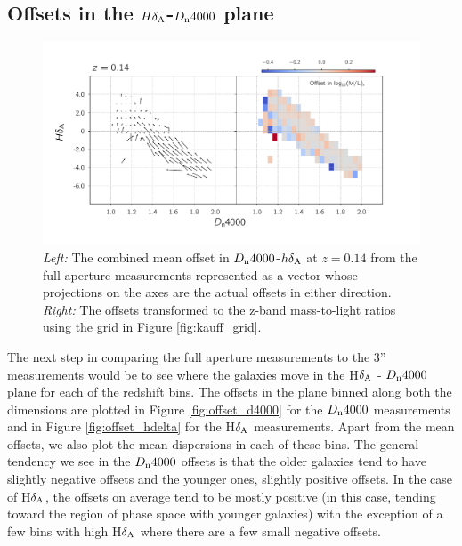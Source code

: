 \subsection{Offsets in the $H\delta_{\rm A}$-$D_{\rm n}4000$ plane}

\begin{figure}
\includegraphics[width=\textwidth]{figures/mlz_offset_c.pdf}
\caption[ \emph{Left:} The combined mean offset in $D_{\rm n}4000$-$h\delta_{\rm A}$ at $z=0.14$ from the full aperture measurements represented as a vector whose projections on the axes are the actual offsets in either direction. \emph{Right:} The offsets transformed to the z-band mass-to-light ratios using the grid in Figure \ref{fig:kauff_grid}. ]{ \emph{Left:} The combined mean offset in $D_{\rm n}4000$-$h\delta_{\rm A}$ at $z=0.14$ from the full aperture measurements represented as a vector whose projections on the axes are the actual offsets in either direction. \emph{Right:} The offsets transformed to the z-band mass-to-light ratios using the grid in Figure \ref{fig:kauff_grid}.
\label{fig:offset_quiver3}}
\end{figure}

The next step in comparing the full aperture measurements to the 3'' measurements would be to see where the galaxies move in the H$\delta_{\rm A}$ - $D_{\rm n}4000$ plane for each of the redshift bins. The offsets in the plane binned along both the dimensions are plotted in Figure \ref{fig:offset_d4000} for the $D_{\rm n}4000$ measurements and in Figure \ref{fig:offset_hdelta} for the H$\delta_{\rm A}$ measurements. Apart from the mean offsets, we also plot the mean dispersions in each of these bins. The general tendency we see in the $D_{\rm n}4000$ offsets is that the older galaxies tend to have slightly negative offsets and the younger ones, slightly positive offsets. In the case of H$\delta_{\rm A}$, the offsets on average tend to be mostly positive (in this case, tending toward the region of phase space with younger galaxies) with the exception of a few bins with high H$\delta_{\rm A}$ where there are a few small negative offsets.\\

